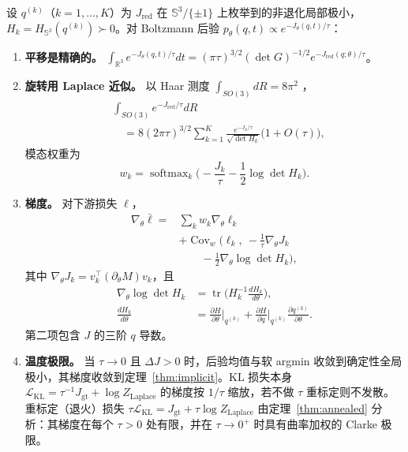\begin{theorem}\label{thm:laplace}
设 $q^{(k)}$（$k=1,\dots,K$）为 $J_{\mathrm{red}}$ 在 $\mathbb{S}^3/\{\pm1\}$ 上枚举到的非退化局部极小，$H_k=H_{\mathbb{S}^3}(q^{(k)})\succ0$。对 Boltzmann 后验 $p_\theta(q,t)\propto e^{-J_\theta(q,t)/\tau}$：
\begin{enumerate}
\item \textbf{平移是精确的。} $\int_{\mathbb{R}^3}e^{-J_\theta(q,t)/\tau}dt=(\pi\tau)^{3/2}(\det G)^{-1/2}e^{-J_{\mathrm{red}}(q;\theta)/\tau}$。
\item \textbf{旋转用 Laplace 近似。} 以 Haar 测度 $\int_{SO(3)}dR=8\pi^2$ \cite{chirikjian2012}，
\begin{equation}
\begin{split}
&\int_{SO(3)}e^{-J_{\mathrm{red}}/\tau}dR\\
&\quad=8(2\pi\tau)^{3/2}\sum_{k=1}^K\frac{e^{-J_k/\tau}}{\sqrt{\det H_k}}\big(1+O(\tau)\big),
\end{split}
\label{eq:rotationint}
\end{equation}
模态权重为
\begin{equation}
w_k=\operatorname{softmax}_k\Big(-\frac{J_k}{\tau}-\frac12\log\det H_k\Big).
\label{eq:weights}
\end{equation}
\item \textbf{梯度。} 对下游损失 $\ell$，
\begin{equation}
\begin{split}
\nabla_\theta\bar\ell={}&\sum_kw_k\nabla_\theta\ell_k\\
&+\operatorname{Cov}_w\Big(\ell_k,\ -\frac1\tau\nabla_\theta J_k\\
&\qquad-\frac12\nabla_\theta\log\det H_k\Big),
\end{split}
\label{eq:smgrad}
\end{equation}
其中 $\nabla_\theta J_k=v_k^\top(\partial_\theta M)v_k$，且
\begin{equation}
\begin{split}
\nabla_\theta\log\det H_k&=\operatorname{tr}\Big(H_k^{-1}\frac{dH_k}{d\theta}\Big),\\
\frac{dH_k}{d\theta}&=\frac{\partial H}{\partial\theta}\Big|_{q^{(k)}}+\frac{\partial H}{\partial q}\Big|_{q^{(k)}}\frac{\partial q^{(k)}}{\partial\theta}.
\end{split}
\label{eq:dlogdet}
\end{equation}
第二项包含 $J$ 的三阶 $q$ 导数。
\item \textbf{温度极限。} 当 $\tau\to0$ 且 $\Delta J>0$ 时，后验均值与软 argmin 收敛到确定性全局极小，其梯度收敛到定理~\ref{thm:implicit}。KL 损失本身 $\mathcal{L}_{\mathrm{KL}}=\tau^{-1}J_{\mathrm{gt}}+\log Z_{\mathrm{Laplace}}$ 的梯度按 $1/\tau$ 缩放，若不做 $\tau$ 重标定则不发散。重标定（退火）损失 $\tau\mathcal{L}_{\mathrm{KL}}=J_{\mathrm{gt}}+\tau\log Z_{\mathrm{Laplace}}$ 由定理~\ref{thm:annealed} 分析：其梯度在每个 $\tau>0$ 处有限，并在 $\tau\to0^+$ 时具有曲率加权的 Clarke 极限。
\end{enumerate}
\end{theorem}

